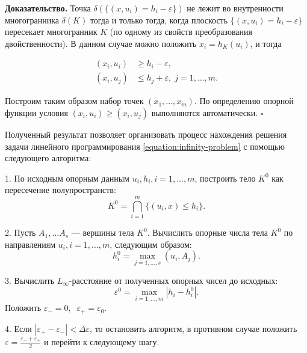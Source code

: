 \documentclass[a4paper, 11pt]{article}
\theoremstyle{MyDefinitionStyle}
\theoremstyle{MyTheoremStyle}
\begin{document}
\textbf{Доказательство.}
Точка $\delta(\{(x, u_{i}) = h_{i} - \varepsilon\})$ не лежит во внутренности
многогранника $\delta(K)$ тогда и только тогда, когда плоскость
$\{(x, u_{i}) = h_{i} - \varepsilon\}$ пересекает многогранник $K$ (по
одному из свойств преобразования двойственности). В данном случае можно положить
$ x_{i} = h_{K}(u_{i}) $, и тогда 

\begin{align*}
 (x_{i}, u_{i}) & \geq h_{i} - \varepsilon, \\
 (x_{i}, u_{j}) & \leq h_{j} + \varepsilon, \; j = 1, \ldots, m.
\end{align*}

Построим таким образом набор точек $(x_{1}, \ldots, x_{m})$. По определению
опорной функции условия $(x_{i}, u_{i}) \geq (x_{i}, u_{j})$ выполняются
автоматически.
$\square$

Полученный результат позволяет организовать процесс нахождения решения задачи
линейного программирования \eqref{equation:infinity-problem} с помощью
следующего алгоритма:


1. По исходным опорным данным $u_{i}, h_{i}, i = 1, \ldots, m$,
 построить тело $K^{0}$ как пересечение полупространств:
 \begin{equation*}
 \label{equation:naive-body}
  K^{0} = \bigcap \limits_{i = 1}^{m} \{(u_{i}, x) \leq h_{i}\}.
 \end{equation*}

2. Пусть $A_{1}, \ldots A_{s}$ --- вершины тела $K^{0}$. Вычислить опорные
 числа тела $K^{0}$ по направлениям $u_{i}, i = 1, \ldots, m$, следующим образом:
 \begin{equation*}
  h^{0}_{i} = \max \limits_{j = 1, \ldots, s} (u_{i}, A_{j}).
 \end{equation*}

3. Вычислить $L_{\infty}$-расстояние от полученных опорных чисел до
 исходных:
 \begin{equation*}
  \varepsilon^{0} = \max \limits_{i = 1, \ldots, m} |h_{i} - h^{0}_{i}|.
 \end{equation*}
 Положить $\varepsilon_{-} = 0, \;\; \varepsilon_{+} = \varepsilon_{0}$.

4. Если $|\varepsilon_{+} - \varepsilon_{-}| < \Delta \varepsilon$, то
 остановить алгоритм, в противном случае положить
 $\varepsilon = \frac{\varepsilon_{-} + \varepsilon_{+}}{2}$ и перейти к
 следующему шагу.
\end{document}
